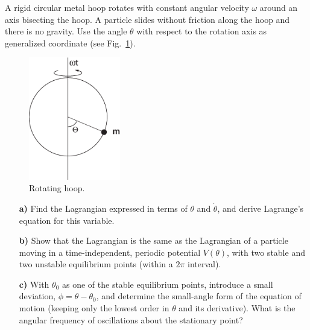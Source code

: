 \documentclass[11pt,a4paper]{report}
\newcounter{excount}[chapter]
\newenvironment{exercise}[1][]{\addtocounter{excount}{1} \noindent {\bf Problem
    \arabic{excount} \ \ #1}\hspace{2mm}}{\vspace{4mm}}
\begin{document}
\begin{exercise}
A rigid circular metal hoop rotates with constant angular velocity $\omega$ around an axis bisecting the hoop. A particle slides without friction along the hoop and there is no gravity. Use the angle $\theta$ with respect to the rotation axis as generalized coordinate (see Fig.~\ref{fig:hoop}).

\begin{figure}[h!]
\begin{center}
\includegraphics[width=4cm]{RotatingHoop.eps}
\end{center}
\caption{Rotating hoop.}
\label{fig:hoop}
\end{figure}

\begin{itemize}
\item[\bf a)] Find the Lagrangian expressed in terms of $\theta$ and $\dot\theta$, and derive Lagrange's equation for this variable.
\item[\bf b)] Show that the Lagrangian is the same as the Lagrangian of a particle moving in a time-independent, periodic potential $V(\theta)$, with two stable and two unstable equilibrium points (within a $2\pi$ interval).
\item[\bf c)] With $\theta_0$ as one of the stable equilibrium points, introduce a small deviation, $\phi=\theta-\theta_0$, and determine the small-angle form of the equation of motion (keeping only the lowest order in $\theta$ and its derivative). What is the angular frequency of oscillations about the stationary point?
\end{itemize}
\end{exercise}
\end{document}
